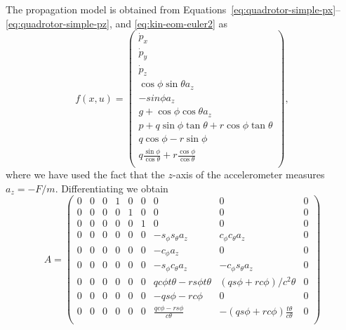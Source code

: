{The propagation model is obtained from
Equations~\eqref{eq:quadrotor-simple-px}--\eqref{eq:quadrotor-simple-pz},
and \eqref{eq:kin-eom-euler2} as
\[
f(x,u) = \begin{pmatrix}
    \dot{p}_x \\
    \dot{p}_y  \\
    \dot{p}_z \\
    \cos\phi\sin\theta a_z \\
    -sin\phi a_z\\
     g + \cos\phi\cos\theta a_z \\
    p + q\sin\phi\tan\theta + r\cos\phi\tan\theta \\
    q\cos\phi -r\sin\phi \\
    q\frac{\sin\phi}{\cos\theta} + r\frac{\cos\phi}{\cos\theta} \\
    \end{pmatrix},
\]
where we have used the fact that the $z$-axis of the accelerometer
measures $a_z = -F/m$.  Differentiating we obtain
\[
A = \begin{pmatrix}
    0 & 0 & 0 & 1 & 0 & 0 & 0 & 0 & 0 \\
    0 & 0 & 0 & 0 & 1 & 0 & 0 & 0 & 0 \\
    0 & 0 & 0 & 0 & 0 & 1 & 0 & 0 & 0 \\
    0 & 0 & 0 & 0 & 0 & 0 & -s_{\phi}s_{\theta} a_z &
        c_{\phi}c_{\theta}a_z & 0 \\
    0 & 0 & 0 & 0 & 0 & 0 & -c_{\phi} a_z & 0 & 0 \\
    0 & 0 & 0 & 0 & 0 & 0 & -s_{\phi}c_{\theta} a_z &
        -c_{\phi}s_{\theta}a_z & 0 \\
    0& 0& 0& 0& 0& 0& q c\phi t\theta -r s\phi t\theta&
            (q s\phi + r c\phi )/c^2\theta & 0 \\
    0& 0& 0& 0& 0& 0& -q s\phi -r c\phi & 0 & 0\\
    0& 0& 0& 0& 0& 0& \frac{q c\phi -r s\phi}{c\theta} &
            -(qs\phi+rc\phi)\frac{t\theta}{c\theta} & 0\\
\end{pmatrix}
\]

}
